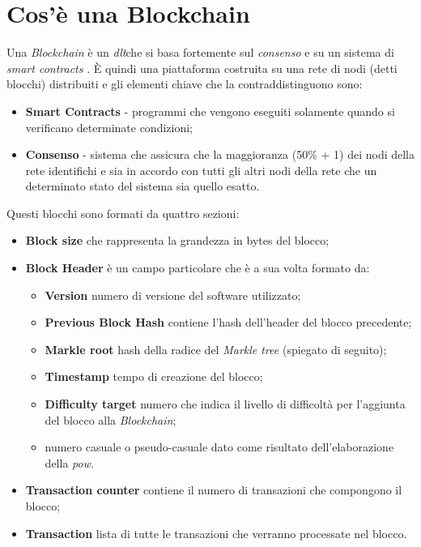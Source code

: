 \section{Cos'è una Blockchain}
Una \textit{Blockchain} è un \emph{\gls{dlt}}\glsfirstoccur che si basa fortemente sul \textit{consenso} e su un sistema di \textit{smart contracts} \cite{linuxFoundation}.
È quindi una piattaforma costruita su una rete di nodi (detti blocchi) distribuiti e gli elementi chiave che la contraddistinguono sono:
\begin{itemize}
	\item \textbf{Smart Contracts} - programmi che vengono eseguiti solamente quando si verificano determinate condizioni;
	\item \textbf{Consenso} - sistema che assicura che la maggioranza (50\% + 1) dei nodi della rete identifichi e sia in accordo con tutti gli altri nodi della rete che un determinato stato del sistema sia quello esatto.
\end{itemize}
Questi blocchi sono formati da quattro sezioni:
\begin{itemize}
	\item \textbf{Block size} che rappresenta la grandezza in bytes del blocco;
	\item \textbf{Block Header} è un campo particolare che è a sua volta formato da:
	\begin{itemize}
		\item \textbf{Version} numero di versione del software utilizzato;
		\item \textbf{Previous Block Hash} contiene l'hash dell'header del blocco precedente;
		\item \textbf{Markle root} hash della radice del \textit{Markle tree} (spiegato di seguito);
		\item \textbf{Timestamp} tempo di creazione del blocco;
		\item \textbf{Difficulty target} numero che indica il livello di difficoltà per l'aggiunta del blocco alla \textit{Blockchain};
		\item numero casuale o pseudo-casuale dato come risultato dell'elaborazione della \emph{\gls{pow}}\glsfirstoccur.
	\end{itemize}
	\item \textbf{Transaction counter} contiene il numero di transazioni che compongono il blocco;
	\item \textbf{Transaction} lista di tutte le transazioni che verranno processate nel blocco.
\end{itemize}
